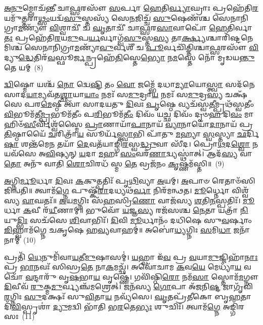 \-\ul{𑌅}\-\-\ul{𑌨𑍁}\-𑌮𑍍𑌲𑍋𑌚᳴𑌨𑍍𑌤𑍀 𑌚𑌾\-\ul{𑌫𑍍𑌸}\-𑌰𑌸𑍗᳴ \ul{𑌸}\-𑌰𑍍𑌪𑌾 \ul{𑌹𑍇}\-𑌤𑌿\-\ul{𑌰𑍍𑌵𑍍𑌯𑌾}\-𑌘𑍍𑌰𑌾𑌃 𑌪𑍍𑌰𑌹𑍇᳴𑌤𑌿\-\ul{𑌰}\-𑌯𑌮𑍁᳴\-\ul{𑌤𑍍𑌤}\-𑌰𑌾\-\ul{𑌥𑍍𑌸𑌂}\-𑌯𑌦𑍍𑌵᳴\-\ul{𑌸𑍁}\-𑌸𑍍𑌤𑌸𑍍𑌯᳴ 𑌸𑍇\-\ul{𑌨}\-𑌜𑌿𑌚𑍍𑌚᳴ \ul{𑌸𑍁}\-𑌷𑍇𑌣᳴𑌶𑍍𑌚 𑌸𑍇𑌨𑌾𑌨𑌿𑌗𑍍𑌰𑌾\-\ul{𑌮}\-𑌣𑍍𑌯𑍗᳴ \ul{𑌵𑌿}\-𑌶𑍍𑌵𑌾𑌚𑍀᳴ 𑌚 \ul{𑌘𑍃}\-𑌤𑌾𑌚𑍀᳴ 𑌚𑌾\-\ul{𑌫𑍍𑌸}\-𑌰\-\ul{𑌸𑌾}\-𑌵𑌾𑌪𑍋᳴ \ul{𑌹𑍇}\-𑌤𑌿𑌰𑍍𑌵𑌾\-\ul{𑌤𑌃} 𑌪𑍍𑌰𑌹𑍇᳴𑌤𑌿\-\ul{𑌰}\-𑌯\-\ul{𑌮𑍁}\-𑌪\-\ul{𑌰𑍍𑌯}\-𑌰𑍍𑌵𑌾𑌗𑍍𑌵᳴\-\ul{𑌸𑍁}\-𑌸𑍍𑌤\-\ul{𑌸𑍍𑌯} 𑌤𑌾\-\ul{𑌰𑍍𑌕𑍍𑌷𑍍𑌯}\-𑌶𑍍𑌚𑌾𑌰𑌿᳴𑌷𑍍𑌟𑌨𑍇𑌮𑌿𑌶𑍍𑌚 𑌸𑍇𑌨𑌾𑌨𑌿𑌗𑍍𑌰𑌾\-\ul{𑌮}\-𑌣𑍍𑌯𑌾᳴\-\-\ul{𑌵𑍁}\-𑌰𑍍𑌵𑌶𑍀᳴ 𑌚 \ul{𑌪𑍂}\-𑌰𑍍𑌵𑌚𑌿᳴𑌤𑍍𑌤𑌿𑌶𑍍𑌚𑌾\-\ul{𑌫𑍍𑌸}\-𑌰𑌸𑍗᳴ \ul{𑌵𑌿}\-𑌦𑍍𑌯𑍁\-\ul{𑌦𑍍𑌧𑍇}\-𑌤𑌿𑌰᳴\-\ul{𑌵}\-𑌸𑍍𑌫𑍂\-\ul{𑌰𑍍𑌜}\-𑌨𑍍𑌪𑍍𑌰𑌹𑍇᳴\-\ul{𑌤𑌿}\-𑌸𑍍𑌤𑍇\-\ul{𑌭𑍍𑌯𑍋} 𑌨\-\ul{𑌮}\-𑌸𑍍𑌤𑍇 𑌨𑍋᳴ 𑌮𑍃𑌡𑌯\-\ul{𑌨𑍍𑌤𑍁} 𑌤𑍇 𑌯𑌮𑍍~(8)

\-\ul{𑌦𑍍𑌵𑌿}\-𑌷𑍍𑌮𑍋 𑌯𑌶𑍍𑌚᳴ \ul{𑌨𑍋} 𑌦𑍍𑌵𑍇\-\ul{𑌷𑍍𑌟𑌿} 𑌤𑌂 \ul{𑌵𑍋} 𑌜𑌮𑍍𑌭𑍇᳴ 𑌦𑌧𑌾\-\ul{𑌮𑍍𑌯𑌾}\-𑌯𑍋\-\ul{𑌸𑍍𑌤𑍍𑌵𑌾} 𑌸𑌦᳴𑌨𑍇 𑌸𑌾𑌦\-\ul{𑌯𑌾}\-𑌮𑍍𑌯𑌵᳴𑌤\-\ul{𑌶𑍍𑌛𑌾}\-𑌯𑌾\-\ul{𑌯𑌾𑌂} 𑌨𑌮𑌃᳴ 𑌸\-\ul{𑌮𑍁}\-𑌦𑍍𑌰𑌾\-\ul{𑌯} 𑌨𑌮𑌃᳴ 𑌸\-\ul{𑌮𑍁}\-𑌦𑍍𑌰\-\ul{𑌸𑍍𑌯} 𑌚𑌕𑍍𑌷᳴𑌸𑍇 𑌪𑌰\-\ul{𑌮𑍇}\-𑌷𑍍𑌠𑍀 𑌤𑍍𑌵𑌾᳴ 𑌸𑌾𑌦𑌯𑌤𑍁 \ul{𑌦𑌿}\-𑌵𑌃 \ul{𑌪𑍃}\-𑌷𑍍𑌠𑍇 𑌵𑍍𑌯𑌚᳴𑌸𑍍𑌵\-\ul{𑌤𑍀}\-𑌮𑍍𑌪𑍍𑌰𑌥᳴𑌸𑍍𑌵𑌤𑍀𑌂 \ul{𑌵𑌿}\-𑌭𑍂𑌮᳴𑌤𑍀\-\ul{𑌮𑍍𑌪𑍍𑌰}\-𑌭𑍂𑌮᳴𑌤𑍀𑌂 𑌪\-\ul{𑌰𑌿}\-𑌭𑍂𑌮᳴\-\ul{𑌤𑍀𑌂} 𑌦𑌿𑌵𑌂᳴ 𑌯\-\ul{𑌚𑍍𑌛} 𑌦𑌿𑌵𑌂᳴ 𑌦𑍃𑍞\-\ul{𑌹} 𑌦𑌿\-\ul{𑌵𑌂} 𑌮𑌾 𑌹𑌿𑍞᳴\-\ul{𑌸𑍀}\-𑌰𑍍𑌵𑌿𑌶𑍍𑌵᳴𑌸𑍍𑌮𑍈 \ul{𑌪𑍍𑌰𑌾}\-𑌣𑌾𑌯𑌾᳴\-\ul{𑌪𑌾}\-𑌨𑌾𑌯᳴ \ul{𑌵𑍍𑌯𑌾}\-𑌨𑌾𑌯𑍋᳴\-\ul{𑌦𑌾}\-𑌨𑌾𑌯᳴ 𑌪𑍍𑌰\-\ul{𑌤𑌿}\-𑌷𑍍𑌠𑌾𑌯𑍈᳴ \ul{𑌚}\-𑌰𑌿𑌤𑍍𑌰𑌾᳴\-\ul{𑌯} 𑌸𑍂𑌰𑍍𑌯᳴\-\ul{𑌸𑍍𑌤𑍍𑌵𑌾}\-𑌭𑌿 𑌪𑌾᳴𑌤𑍁 \ul{𑌮}\-𑌹𑍍𑌯𑌾 \ul{𑌸𑍍𑌵}\-𑌸𑍍𑌤𑍍𑌯𑌾 \ul{𑌛}\-𑌰𑍍𑌦𑌿\-\ul{𑌷𑌾} 𑌶𑌨𑍍𑌤᳴𑌮𑍇\-\ul{𑌨} 𑌤𑌯𑌾᳴ \ul{𑌦𑍇}\-𑌵𑌤᳴𑌯𑌾𑌙𑍍𑌗𑌿\-\ul{𑌰}\-𑌸𑍍𑌵\-\ul{𑌦𑍍𑌧𑍍𑌰𑍁}\-𑌵𑌾 𑌸𑍀᳴𑌦। 𑌪𑍍𑌰𑍋\-\ul{𑌥}\-𑌦\-\ul{𑌶𑍍𑌵𑍋} 𑌨 𑌯𑌵᳴𑌸𑍇 𑌅\-\ul{𑌵𑌿}\-𑌷𑍍𑌯𑌨𑍍 \ul{𑌯}\-𑌦𑌾 \ul{𑌮}\-𑌹𑌃 \ul{𑌸𑌂}\-𑌵𑌰᳴\-\ul{𑌣𑌾}\-𑌦𑍍𑌵𑍍𑌯𑌸𑍍𑌥𑌾॑𑌤𑍍। 𑌆𑌦᳴\-\ul{𑌸𑍍𑌯} 𑌵𑌾\-\ul{𑌤𑍋} 𑌅𑌨𑍁᳴ 𑌵𑌾𑌤𑌿 \ul{𑌶𑍋}\-𑌚𑌿𑌰𑌧᳴ 𑌸𑍍𑌮 \ul{𑌤𑍇} 𑌵𑍍𑌰𑌜᳴𑌨𑌂 \ul{𑌕𑍃}\-𑌷𑍍𑌣𑌮᳴𑌸𑍍𑌤𑌿॥~(9)

{\anuvakamend[{\-\ul{𑌪𑍍𑌰}\-𑌮𑍍𑌲𑍋𑌚᳴𑌨𑍍𑌤𑍀 \ul{𑌚} 𑌯𑍟 \ul{𑌸𑍍𑌵}\-𑌸𑍍𑌤𑍍𑌯𑌾𑌷𑍍𑌟𑌾𑌵𑌿𑍞᳴𑌶𑌤𑌿𑌶𑍍𑌚}]}%

\-\ul{𑌅}\-𑌗𑍍𑌨𑌿\-\ul{𑌰𑍍𑌮𑍂}\-𑌰𑍍𑌧𑌾 \ul{𑌦𑌿}\-𑌵𑌃 \ul{𑌕}\-𑌕𑍁𑌤𑍍𑌪𑌤𑌿𑌃᳴ 𑌪𑍃\-\ul{𑌥𑌿}\-𑌵𑍍𑌯𑌾 \ul{𑌅}\-𑌯𑌮𑍍। \ul{𑌅}\-𑌪𑌾𑍞 𑌰𑍇𑌤𑌾𑍞᳴𑌸𑌿 𑌜𑌿𑌨𑍍𑌵𑌤𑌿॥ 𑌤𑍍𑌵𑌾𑌮᳴\-\ul{𑌗𑍍𑌨𑍇} 𑌪𑍁𑌷𑍍𑌕᳴\-\ul{𑌰𑌾}\-𑌦𑌧𑍍𑌯𑌥᳴\-\ul{𑌰𑍍𑌵𑌾} 𑌨𑌿𑌰᳴𑌮𑌨𑍍𑌥𑌤। \ul{𑌮𑍂}\-𑌰𑍍𑌧𑍍𑌨𑍋 𑌵𑌿𑌶𑍍𑌵᳴𑌸𑍍𑌯 \ul{𑌵𑌾}\-𑌘𑌤𑌃᳴॥ \ul{𑌅}\-𑌯\-\ul{𑌮}\-𑌗𑍍𑌨𑌿𑌃 𑌸᳴\-\ul{𑌹}\-𑌸𑍍𑌰𑌿\-\ul{𑌣𑍋} 𑌵𑌾𑌜᳴𑌸𑍍𑌯 \ul{𑌶}\-𑌤𑌿\-\ul{𑌨}\-𑌸𑍍𑌪𑌤𑌿𑌃᳴। \ul{𑌮𑍂}\-𑌰𑍍𑌧𑌾 \ul{𑌕}\-𑌵𑍀 𑌰᳴\-\ul{𑌯𑍀}\-𑌣𑌾𑌮𑍍॥ 𑌭𑍁𑌵𑍋᳴ \ul{𑌯}\-𑌜𑍍𑌞\-\ul{𑌸𑍍𑌯} 𑌰𑌜᳴𑌸𑌶𑍍𑌚 \ul{𑌨𑍇}\-𑌤𑌾 𑌯𑌤𑍍𑌰𑌾᳴ \ul{𑌨𑌿}\-𑌯𑍁\-\ul{𑌦𑍍𑌭𑌿𑌃} 𑌸𑌚᳴𑌸𑍇 \ul{𑌶𑌿}\-𑌵𑌾𑌭𑌿𑌃᳴। \ul{𑌦𑌿}\-𑌵𑌿 \ul{𑌮𑍂}\-𑌰𑍍𑌧𑌾𑌨𑌂᳴ 𑌦𑌧𑌿𑌷𑍇 𑌸𑍁\-\ul{𑌵}\-𑌰𑍍\mbox{}𑌷𑌾𑌂 \ul{𑌜𑌿}\-𑌹𑍍𑌵𑌾𑌮᳴𑌗𑍍𑌨𑍇 𑌚𑌕𑍃𑌷𑍇 𑌹\-\ul{𑌵𑍍𑌯}\-𑌵𑌾𑌹𑌮𑍍॑॥ 𑌅𑌬𑍋॑\-\ul{𑌧𑍍𑌯}\-𑌗𑍍𑌨𑌿𑌃 \ul{𑌸}\-𑌮𑌿\-\ul{𑌧𑌾} 𑌜𑌨𑌾᳴𑌨𑌾𑌮𑍍~(10)

𑌪𑍍𑌰𑌤𑌿᳴ \ul{𑌧𑍇}\-𑌨𑍁𑌮𑌿᳴𑌵𑌾\-\ul{𑌯}\-𑌤𑍀\-\ul{𑌮𑍁}\-𑌷𑌾𑌸𑌮𑍍॑। \ul{𑌯}\-𑌹𑍍𑌵𑌾 𑌇᳴\-\ul{𑌵} 𑌪𑍍𑌰 \ul{𑌵}\-𑌯𑌾\-\ul{𑌮𑍁}\-𑌜𑍍𑌜𑌿𑌹𑌾᳴\-\ul{𑌨𑌾𑌃} 𑌪𑍍𑌰 \ul{𑌭𑌾}\-𑌨𑌵𑌃᳴ 𑌸𑌿𑌸𑍍𑌰\-\ul{𑌤𑍇} 𑌨𑌾\-\ul{𑌕}\-𑌮𑌚𑍍𑌛᳴। 𑌅𑌵𑍋᳴𑌚𑌾𑌮 \ul{𑌕}\-𑌵\-\ul{𑌯𑍇} 𑌮𑍇𑌧𑍍𑌯𑌾᳴\-\ul{𑌯} 𑌵𑌚𑍋᳴ \ul{𑌵}\-𑌨𑍍𑌦𑌾𑌰𑍁᳴ 𑌵𑍃\-\ul{𑌷}\-𑌭𑌾\-\ul{𑌯} 𑌵𑍃𑌷𑍍𑌣𑍇॑। 𑌗𑌵𑌿᳴𑌷𑍍𑌠𑌿\-\ul{𑌰𑍋} 𑌨𑌮᳴\-\ul{𑌸𑌾} 𑌸𑍍𑌤𑍋𑌮᳴\-\ul{𑌮}\-𑌗𑍍𑌨𑍗 \ul{𑌦𑌿}\-𑌵𑍀𑌵᳴ \ul{𑌰𑍁}\-𑌕𑍍𑌮\-\ul{𑌮𑍁}\-𑌰𑍍𑌵𑍍𑌯𑌞𑍍𑌚᳴𑌮𑌶𑍍𑌰𑍇𑌤𑍍। 𑌜𑌨᳴𑌸𑍍𑌯 \ul{𑌗𑍋}\-𑌪𑌾 𑌅᳴𑌜𑌨𑌿\-\ul{𑌷𑍍𑌟} 𑌜𑌾𑌗𑍃᳴𑌵𑌿\-\ul{𑌰}\-𑌗𑍍𑌨𑌿𑌃 \ul{𑌸𑍁}\-𑌦𑌕𑍍𑌷𑌃᳴ 𑌸𑍁\-\ul{𑌵𑌿}\-𑌤𑌾\-\ul{𑌯} 𑌨𑌵𑍍𑌯᳴𑌸𑍇। \ul{𑌘𑍃}\-𑌤𑌪𑍍𑌰᳴𑌤𑍀𑌕𑍋 𑌬𑍃\-\ul{𑌹}\-𑌤𑌾 𑌦𑌿᳴\-\ul{𑌵𑌿}\-𑌸𑍍𑌪𑍃𑌶𑌾॑ \ul{𑌦𑍍𑌯𑍁}\-𑌮𑌦𑍍𑌵𑌿 𑌭𑌾᳴𑌤𑌿 𑌭\-\ul{𑌰}\-𑌤𑍇\-\ul{𑌭𑍍𑌯𑌃} 𑌶𑍁𑌚𑌿𑌃᳴। 𑌤𑍍𑌵𑌾𑌮᳴\-\ul{𑌗𑍍𑌨𑍇} 𑌅𑌙𑍍𑌗𑌿᳴𑌰𑌸𑌃~(11)

